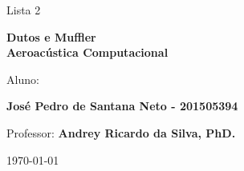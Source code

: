 {\begin{capa}
\begin{figure}[!ht]
\begin{minipage}[c]{0.78\textwidth}
\begin{minipage}[t]{1\linewidth}
		\vspace{2cm}
		\Huge Lista 2
		
	
		\vspace{1cm}
		 \textbf{Dutos e Muffler\\
		 	\Large{Aeroacústica Computacional}}
		
		\vspace{6cm}
		
		\large
		Aluno:
		
		\textbf{José Pedro de Santana Neto - 201505394}\\
		
		\vspace{6cm}
		
		
		\large
		Professor:
		\textbf{Andrey Ricardo da Silva, PhD.}
		
		
		\vspace{3cm}
		\vfill
		
		\today 
  \end{minipage}
\end{minipage}
\end{figure}	
	
\end{capa}

\restoregeometry








}
